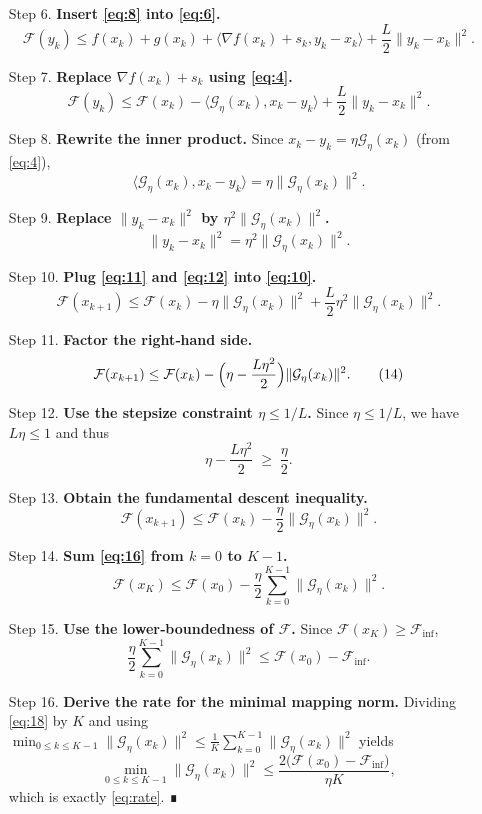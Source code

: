 \documentclass{article}
\newcommand{\grad}{\nabla}
\newcommand{\G}{\mathcal{G}}
\newcommand{\F}{\mathcal{F}}
\begin{document}
\begin{enumerate}
\item[Step 6.] \textbf{Insert \eqref{eq:8} into \eqref{eq:6}.}
\[
\F(y_{k})\le f(x_{k})+g(x_{k})+\langle\grad f(x_{k})+s_{k},y_{k}-x_{k}\rangle+\frac{L}{2}\|y_{k}-x_{k}\|^{2}.
\tag{9}
\]

\item[Step 7.] \textbf{Replace $\grad f(x_{k})+s_{k}$ using \eqref{eq:4}.}
\[
\F(y_{k})\le \F(x_{k})-\langle\G_{\eta}(x_{k}),x_{k}-y_{k}\rangle+\frac{L}{2}\|y_{k}-x_{k}\|^{2}.
\tag{10}
\]

\item[Step 8.] \textbf{Rewrite the inner product.}  
Since $x_{k}-y_{k}= \eta\G_{\eta}(x_{k})$ (from \eqref{eq:4}),
\[
\langle\G_{\eta}(x_{k}),x_{k}-y_{k}\rangle
= \eta\|\G_{\eta}(x_{k})\|^{2}.
\tag{11}
\]

\item[Step 9.] \textbf{Replace $\|y_{k}-x_{k}\|^{2}$ by $\eta^{2}\|\G_{\eta}(x_{k})\|^{2}$.}
\[
\|y_{k}-x_{k}\|^{2}= \eta^{2}\|\G_{\eta}(x_{k})\|^{2}.
\tag{12}
\]

\item[Step 10.] \textbf{Plug \eqref{eq:11} and \eqref{eq:12} into \eqref{eq:10}.}
\[
\F(x_{k+1})\le \F(x_{k})-\eta\|\G_{\eta}(x_{k})\|^{2}
+\frac{L}{2}\eta^{2}\|\G_{\eta}(x_{k})\|^{2}.
\tag{13}
\]

\item[Step 11.] \textbf{Factor the right‑hand side.}
\[
\F(x_{k+1})\le \F(x_{k})-\Bigl(\eta-\frac{L\eta^{2}}{2}\Bigr)\|\G_{\eta}(x_{k})\|^{2}.
\tag{14}
\]

\item[Step 12.] \textbf{Use the stepsize constraint $\eta\le 1/L$.}  
Since $\eta\le 1/L$, we have $L\eta\le1$ and thus
\[
\eta-\frac{L\eta^{2}}{2}\;\ge\;\frac{\eta}{2}.
\tag{15}
\]

\item[Step 13.] \textbf{Obtain the fundamental descent inequality.}
\[
\boxed{\F(x_{k+1})\le \F(x_{k})-\frac{\eta}{2}\|\G_{\eta}(x_{k})\|^{2}}.
\tag{16}
\]

\item[Step 14.] \textbf{Sum \eqref{eq:16} from $k=0$ to $K-1$.}
\[
\F(x_{K})\le \F(x_{0})-\frac{\eta}{2}\sum_{k=0}^{K-1}\|\G_{\eta}(x_{k})\|^{2}.
\tag{17}
\]

\item[Step 15.] \textbf{Use the lower‑boundedness of $\F$.}
Since $\F(x_{K})\ge \F_{\inf}$,
\[
\frac{\eta}{2}\sum_{k=0}^{K-1}\|\G_{\eta}(x_{k})\|^{2}
\le \F(x_{0})-\F_{\inf}.
\tag{18}
\]

\item[Step 16.] \textbf{Derive the rate for the minimal mapping norm.}
Dividing \eqref{eq:18} by $K$ and using $\min_{0\le k\le K-1}\|\G_{\eta}(x_{k})\|^{2}\le \frac{1}{K}\sum_{k=0}^{K-1}\|\G_{\eta}(x_{k})\|^{2}$ yields
\[
\min_{0\le k\le K-1}\|\G_{\eta}(x_{k})\|^{2}
\le \frac{2\bigl(\F(x_{0})-\F_{\inf}\bigr)}{\eta K},
\]
which is exactly \eqref{eq:rate}. ∎


\end{enumerate}
\end{document}
